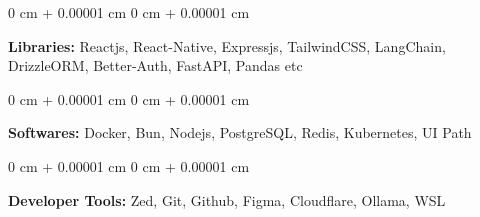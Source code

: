 \documentclass[10pt, letterpaper]{article}
\newenvironment{onecolentry}{
    \begin{adjustwidth}{
        0 cm + 0.00001 cm
    }{
        0 cm + 0.00001 cm
    }
}{
    \end{adjustwidth}
} %
\begin{document}
\begin{onecolentry}
	\textbf{Libraries:} Reactjs, React-Native, Expressjs, TailwindCSS, LangChain, DrizzleORM, Better-Auth, FastAPI, Pandas etc
\end{onecolentry}
\vspace{0.2 cm}

\begin{onecolentry}
	\textbf{Softwares:} Docker, Bun, Nodejs, PostgreSQL, Redis, Kubernetes, UI Path %
\end{onecolentry}
\vspace{0.2 cm}

\begin{onecolentry}
	\textbf{Developer Tools:} Zed, Git, Github, Figma, Cloudflare, Ollama, WSL
\end{onecolentry}
\end{document}
